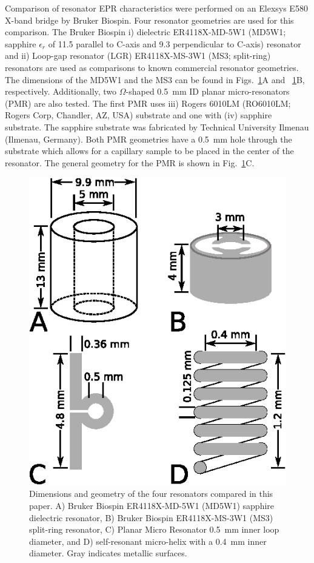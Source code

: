 Comparison of resonator EPR characteristics were performed on an Elexsys E580 X-band bridge by Bruker Biospin. Four resonator geometries are used for this comparison. The Bruker Biospin i) dielectric ER4118X-MD-5W1 (MD5W1; sapphire $\epsilon_r$ of 11.5 parallel to C-axis and 9.3 perpendicular to C-axis) resonator and ii) Loop-gap resonator (LGR) ER4118X-MS-3W1 (MS3; split-ring) resonators are used as comparisons to known commercial resonator geometries. The dimensions of the MD5W1 and the MS3 can be found in Figs.~\ref{fig:geo}A and ~\ref{fig:geo}B, respectively. Additionally, two $\Omega$-shaped 0.5~mm ID planar micro-resonators (PMR) are also tested. \cite{Suter2005, Suter2008, NARKOWICZ201379, suter2015} The first PMR uses iii) Rogers 6010LM (RO6010LM; Rogers Corp, Chandler, AZ, USA) substrate and one with (iv) sapphire substrate. The sapphire substrate was fabricated by Technical University Ilmenau (Ilmenau, Germany). Both PMR geometries have a 0.5~mm hole through the substrate which allows for a capillary sample to be placed in the center of the resonator. The general geometry for the PMR is shown in Fig.~\ref{fig:geo}C.

\begin{figure}[htbp]
\centering
 \includegraphics{Kapitel/Appendix/Images/S1-Geometries.eps}
 \caption[Geometries of resonators in this work.]{Dimensions and geometry of the four resonators compared in this paper. A) Bruker Biospin ER4118X-MD-5W1 (MD5W1) sapphire dielectric resonator, B) Bruker Biospin ER4118X-MS-3W1 (MS3) split-ring resonator, C) Planar Micro Resonator 0.5~mm inner loop diameter, and D) self-resonant micro-helix with a 0.4~mm inner diameter. Gray indicates metallic surfaces.}
 \label{fig:geo}
\end{figure}

